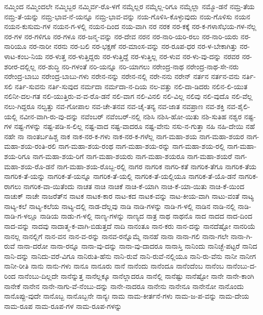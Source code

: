 ನಮ್ಮಿಂದ
ನಮ್ಮಿಂದಲೇ
ನಮ್ಮಿಬ್ಬರ
ನಮ್ಮಿರ್ವ-ರೊ-ಳಗೆ
ನಮ್ಮೆಲ್ಲರ
ನಮ್ಮೆಲ್ಲ-ರಿಗೂ
ನಮ್ಮೆಲ್ಲಾ
ನಮ್ಮೊ-ಡನೆ
ನಮ್ರ-ತೆಯ
ನಮ್ರ-ತೆ-ಯನ್ನು
ನಮ್ರ-ಭಾವ-ನೆ-ಯನ್ನೂ
ನಮ್ರ-ಭಾವ-ವನ್ನು
ನಯ-ಗೊಳಿಸಿ-ಕೊಳ್ಳುವುದು
ನಯ-ಗೊಳಿಸು
ನಯನ
ನಯನ-ಕುಸುಮ-ಗಳ
ನಯನ-ಗ-ಳಲ್ಲಿ
ನಯನ-ದಿಂದ
ನಯ-ವಾಗಿ
ನರ
ನರಕ
ನರ-ಕಕ್ಕೆ
ನರ-ಕ-ಗಳಾಸೆಭಯ-ಗಳ-ನೆಲ್ಲ
ನರ-ಗಳ
ನರ-ಗಳಿಗೂ
ನರ-ಗಳೂ
ನರ-ಜನ್ಮ-ವನ್ನು
ನರ-ದೇವ
ನರನ
ನರ-ನಾರಿ-ಯರಿ-ರಲು
ನರ-ನಾರಿ-ಯರು
ನರ-ನಾರಿಯೂ
ನರ-ನಾರೀ
ನರನು
ನರ-ಬಲಿ
ನರ-ಭಕ್ಷಣೆ
ನರ-ಮಾಂಸ-ವನ್ನು
ನರ-ರೂಪ-ಧರ
ನರ-ಳ-ಬೇಕಾಗಿತ್ತು
ನರ-ಳಾಟ-ಕಂಬ-ನಿಯ
ನರ-ಳುತ್ತ
ನರ-ಳುತ್ತಿದ್ದರು
ನರ-ಳುತ್ತಿದ್ದೆ
ನರ-ಳುತ್ತಿಲ್ಲ
ನರ-ಳುವ
ನರ-ಳು-ವು-ದನ್ನು
ನರವರ
ನರ-ಶರೀರ-ದಲ್ಲಿಲ್ಲ
ನರ-ಶುದ್ಧಿ
ನರಿ-ಗಳಂತೆ
ನರಿ-ಯನ್ನೂ
ನರಿ-ಯಾಗಲು
ನರೇಂದ್ರ-ನಾಥ
ನರೇಂದ್ರ-ನಾಥ-ಸೇ-ನರು
ನರೇಂದ್ರ-ಬಾಬು
ನರೇಂದ್ರ-ಬಾಬು-ಗಳು
ನರೇನ-ನನ್ನು
ನರೇನ-ನಲ್ಲಿ
ನರೇ-ನನು
ನರೇನ್
ನರ್ತನ
ನರ್ತನ-ವನು
ನರ್ತಿ-ಸಲಿ
ನರ್ತಿ-ಸುವನು
ನರ್ತಿ-ಸುವುದ
ನರ್ಮದಾ
ನರ್ಮದಾ-ನ-ದಿಯ
ನಲ-ವತ್ತು
ನಲಿ-ದಾ-ಡಿದರು
ನಲಿನ-ಲಿ-ಯುತ
ನಲಿನೀ-ದಲ-ಗತ
ನಲಿ-ಯುತ್ತಿರು-ವ-ವ-ರೊ-ಡನೆ
ನಲಿ-ವಾಗ
ನಲಿ-ವಿನಲಿ
ನಲಿ-ವಿಲ್ಲ
ನಲಿವು
ನಲಿ-ವುದೊ
ನಲಿ-ವೆಲ್ಲ
ನಲು-ಗಿದ್ದರೂ
ನಲ್ವತ್ತು
ನವ-ಗೋಪಾಲ
ನವ-ಚೇ-ತನವ
ನವ-ಚೈ-ತನ್ಯ
ನವ-ಜಾತ
ನವಪ್ರಾಣ
ನವ-ಶಕ್ತಿ
ನವ-ಶೈಲಿ-ಯಲ್ಲಿ
ನವೀನ-ವಾಗಿ-ರು-ವು-ದನ್ನು
ನವೆಂಬರ್
ನವೆಂಬರ್‌-ನಲ್ಲಿ
ನಶಿಸಿ
ನಶಿಸಿ-ಹೋ-ಯಿತು
ನಶಿ-ಸುತಿಹ
ನಶ್ವರ
ನಷ್ಟ-ಗಳ
ನಷ್ಟ-ಗಳನ್ನು
ನಷ್ಟ-ಪಡಿ-ಸ-ಲಿಲ್ಲ
ನಷ್ಟ-ವಾದ
ನಷ್ಟ-ವಾದರೂ
ನಷ್ಟ-ವೇನು
ನಸು-ನ-ಗುತ್ತಾ
ನಹಿ
ನಹಿ-ದೇಯಿ
ನಹೆ
ನಹೇ
ನಾ
ನಾಂತರ್ಬಹಿಶ್ಚ
ನಾಕ
ನಾಕ-ನರ-ಕ-ಗಳು
ನಾಕ-ನರ-ಕ-ಗಳೆಲ್ಲ
ನಾಗ-ಮಹಾ-ಶಯ
ನಾಗ-ಮಹಾ-ಶಯರ
ನಾಗ-ಮಹಾ-ಶಯ-ರಂತಿ-ರಲಿ
ನಾಗ-ಮಹಾ-ಶಯ-ರಂಥ
ನಾಗ-ಮಹಾ-ಶಯ-ರನ್ನು
ನಾಗ-ಮಹಾ-ಶಯ-ರಲ್ಲಿ
ನಾಗ-ಮಹಾ-ಶಯ-ರಿಗೂ
ನಾಗ-ಮಹಾ-ಶಯ-ರಿಗೆ
ನಾಗ-ಮಹಾ-ಶಯರು
ನಾಗ-ಮಹಾ-ಶಯರೂ
ನಾಗ-ಮಹಾ-ಶಯರೆ
ನಾಗ-ಮಹಾ-ಶಯ-ರೊ-ಡನೆ
ನಾಗ-ಮಹಾ-ಶಯ-ರೊಬ್ಬ-ರಲ್ಲಿ
ನಾಗರ
ನಾಗರಿಕ
ನಾಗರಿ-ಕತೆ
ನಾಗರಿಕ-ತೆಗೂ
ನಾಗರಿಕ-ತೆಯ
ನಾಗರಿಕ-ತೆ-ಯನ್ನು
ನಾಗರಿಕ-ತೆ-ಯನ್ನೂ
ನಾಗರಿಕ-ತೆ-ಯಲ್ಲಿ
ನಾಗರಿಕ-ತೆ-ಯಲ್ಲಿಯೂ
ನಾಗರಿಕ-ತೆ-ಯೊ-ಡನೆ
ನಾಗರಿಕ-ರಾಗಲು
ನಾಗರಿಕ-ವಾ-ಯಿತೆಂದು
ನಾಚತ
ನಾಚಿ
ನಾಚಿಕೆ
ನಾಚಿ-ಕೆ-ಯಾಗಿ
ನಾಚಿ-ಕೆ-ಯಾ-ಯಿತು
ನಾಚಿ-ಕೆ-ಯಿಂದ
ನಾಚುಕ್
ನಾಚೇ
ನಾಜರೆತ್‌ನ
ನಾಟಕ
ನಾಟಕ-ಕಾರ
ನಾಟ-ಕದ
ನಾಟಕ-ವನ್ನು
ನಾಟ-ಕೀಯ-ವಾಗಿ
ನಾಟು-ವಂತೆ
ನಾಟ್ಯ
ನಾಟ್ಯ-ಕಲೆ
ನಾಟ್ಯ-ಕಲೆಯ
ನಾಟ್ಯ-ದಲ್ಲಿ
ನಾಡ-ದೆಲ್ಲವು
ನಾಡಿ
ನಾಡಿ-ಗಳನ್ನು
ನಾಡಿ-ಗ-ಳಲ್ಲಿ
ನಾಡಿನ
ನಾಡಿ-ನಲ್ಲಿ
ನಾಡಿ-ನಾಡಿ-ಗ-ಳಲ್ಲೂ
ನಾಡಿಯ
ನಾಡು-ಗ-ಳಲ್ಲಿ
ನಾಣ್ಯ-ಗಳನ್ನು
ನಾಣ್ಯದ
ನಾತ್ರ
ನಾಥ
ನಾಥನೊ
ನಾದ
ನಾದದ
ನಾದ-ದಿಂದ
ನಾದ-ವನ್ನು
ನಾದವು
ನಾದಾತ್ಮ-ಕ-ವಾಗಿ-ಬಿಡುತ್ತದೆ
ನಾದಿ
ನಾನಂತೂ
ನಾನ-ಕರು
ನಾನ-ದನ್ನು
ನಾನದೆಷ್ಟೋ
ನಾನರಿಯೆ
ನಾನಲ್ಲ
ನಾನಲ್ಲಿಗೆ
ನಾನ-ವನ
ನಾನ-ವ-ರನ್ನು
ನಾನವ-ರನ್ನೊಮ್ಮೆ
ನಾನಹೆ
ನಾನಾ
ನಾನಾ-ಗಲಿ
ನಾನಾ-ಗಲೇ
ನಾನಾ-ಗಿ-ರುವೆ
ನಾನಾ-ದರೋ
ನಾನಾ-ರನ್ನೂ
ನಾನಾ-ವು-ದನ್ನು
ನಾನಾ-ವು-ದಾದರೂ
ನಾನಾಸ್ತಿ
ನಾನಿಂದು
ನಾನಿಚ್ಛೆ-ಪಟ್ಟರೆ
ನಾನಿದ
ನಾನಿ-ದನ್ನು
ನಾನಿದು-ವರೆ-ವಿಗೂ
ನಾನಿರುತಿ-ಹೆನು
ನಾನಿ-ರುವೆ
ನಾನಿ-ರುವೆ-ನಲ್ಲಿಯೂ
ನಾನಿ-ರು-ವೆನು
ನಾನೀ
ನಾನೀಗ
ನಾನೀ-ರೀತಿ
ನಾನು
ನಾನು-ಗಳು
ನಾನೂ
ನಾನೂರು
ನಾನೆ
ನಾನೆಂದು
ನಾನೆಂದೂ
ನಾನೆಂದೆಂಬ
ನಾನೆಂಬ
ನಾನೆಂಬು-ದ-ರಿಂದ
ನಾನೆಂಬು-ದಿಲ್ಲದೇ
ನಾನೆನ್ನುತ್ತ
ನಾನೆಲ್ಲಕ್ಕೂ
ನಾನೆಲ್ಲಾದರೂ
ನಾನೆಲ್ಲಿ
ನಾನೆಷ್ಟು
ನಾನೆಷ್ಟೋ
ನಾನೇ
ನಾನೇ-ಕಾಂಗಿ
ನಾನೇಕೆ
ನಾನೇನ
ನಾನೇ-ನಾಗು-ವೆ-ನೆಂಬು-ದನ್ನು
ನಾನೇ-ನಾದರೂ
ನಾನೇನು
ನಾನೇನೂ
ನಾನೇನೋ
ನಾನೊಂದು
ನಾನೊಪ್ಪು-ವುದೇ
ನಾನೊಬ್ಬ
ನಾನೊಬ್ಬನೇ
ನಾನ್ಯಃ
ನಾಮ
ನಾಮ-ಕೀರ್ತನೆ-ಗಳು
ನಾಮ-ಜ-ಪ-ವನ್ನು
ನಾಮ-ದೇಯ
ನಾಮ-ರೂಪ
ನಾಮ-ರೂಪ-ಗಳ
ನಾಮ-ರೂಪ-ಗಳನ್ನು
